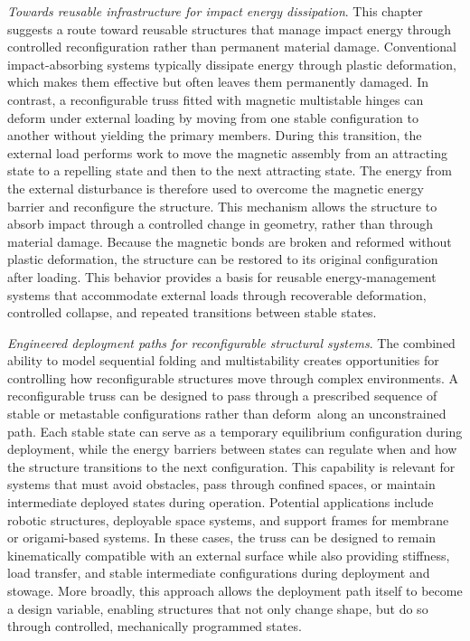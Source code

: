 \textit{Towards reusable infrastructure for impact energy dissipation}. This chapter suggests a route toward reusable structures that manage impact energy through controlled reconfiguration rather than permanent material damage. Conventional impact-absorbing systems typically dissipate energy through plastic deformation, which makes them effective but often leaves them permanently damaged. In contrast, a reconfigurable truss fitted with magnetic multistable hinges can deform under external loading by moving from one stable configuration to another without yielding the primary members.  During this transition, the external load performs work to move the magnetic assembly from an attracting state to a repelling state and then to the next attracting state. The energy from the external disturbance is therefore used to overcome the magnetic energy barrier and reconfigure the structure. This mechanism allows the structure to absorb impact through a controlled change in geometry, rather than through material damage. Because the magnetic bonds are broken and reformed without plastic deformation, the structure can be restored to its original configuration after loading. This behavior provides a basis for reusable energy-management systems that accommodate external loads through recoverable deformation, controlled collapse, and repeated transitions between stable states.

\textit{Engineered deployment paths for reconfigurable structural systems}. The combined ability to model sequential folding and multistability creates opportunities for controlling how reconfigurable structures move through complex environments. A reconfigurable truss can be designed to pass through a prescribed sequence of stable or metastable configurations rather than deform along an unconstrained path. Each stable state can serve as a temporary equilibrium configuration during deployment, while the energy barriers between states can regulate when and how the structure transitions to the next configuration. This capability is relevant for systems that must avoid obstacles, pass through confined spaces, or maintain intermediate deployed states during operation. Potential applications include robotic structures, deployable space systems, and support frames for membrane or origami-based systems. In these cases, the truss can be designed to remain kinematically compatible with an external surface while also providing stiffness, load transfer, and stable intermediate configurations during deployment and stowage. More broadly, this approach allows the deployment path itself to become a design variable, enabling structures that not only change shape, but do so through controlled, mechanically programmed states.

